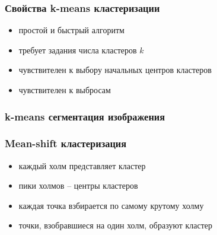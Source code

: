 \documentclass[12pt, usepdftitle=false, aspectratio=1610]{beamer}
\begin{document}
\begin{frame}
\frametitle{Свойства k-means кластеризации}
\begin{itemize}
    \item простой и быстрый алгоритм
    \vspace*{0.2cm}
    \item требует задания числа кластеров $k$
    \vspace*{0.2cm}
    \item  чувствителен к выбору начальных центров кластеров
    \vspace*{0.2cm}
    \item чувствителен к выбросам
\end{itemize}
\end{frame}

\begin{frame}
    \frametitle{k-means сегментация изображения}
    \begin{figure}
        \captionsetup[subfigure]{labelformat=empty}
        \centering
        \qquad
    \end{figure}
    \begin{figure}
        \captionsetup[subfigure]{labelformat=empty}
        \centering
        \qquad
    \end{figure}
\end{frame}


\begin{frame}
    \frametitle{Mean-shift кластеризация}
    \begin{figure}
        \captionsetup[subfigure]{labelformat=empty}
        \centering
        \quad
        \quad
    \end{figure}
    \begin{itemize}
        \item каждый холм представляет кластер
        \item пики холмов -- центры кластеров
        \item каждая точка взбирается по самому крутому холму 
        \item точки, взобравшиеся на один холм, образуют кластер
    \end{itemize}
\end{frame}
\end{document}
